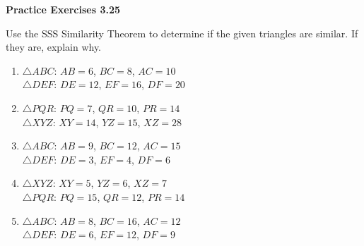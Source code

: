 \vspace{0.3ex}
\noindent\textbf{Practice Exercises 3.25}

\vspace{0.2ex}

Use the SSS Similarity Theorem to determine if the given triangles are similar. If they are, explain why.

\begin{enumerate}[label=\color{blue}\arabic*.]
    \item \(\triangle ABC\): \(AB = 6\), \(BC = 8\), \(AC = 10\) \\
          \(\triangle DEF\): \(DE = 12\), \(EF = 16\), \(DF = 20\)
    \item \(\triangle PQR\): \(PQ = 7\), \(QR = 10\), \(PR = 14\) \\
          \(\triangle XYZ\): \(XY = 14\), \(YZ = 15\), \(XZ = 28\)
    \item \(\triangle ABC\): \(AB = 9\), \(BC = 12\), \(AC = 15\) \\
          \(\triangle DEF\): \(DE = 3\), \(EF = 4\), \(DF = 6\)
    \item \(\triangle XYZ\): \(XY = 5\), \(YZ = 6\), \(XZ = 7\) \\
          \(\triangle PQR\): \(PQ = 15\), \(QR = 12\), \(PR = 14\)
    \item \(\triangle ABC\): \(AB = 8\), \(BC = 16\), \(AC = 12\) \\
          \(\triangle DEF\): \(DE = 6\), \(EF = 12\), \(DF = 9\)
\end{enumerate}
